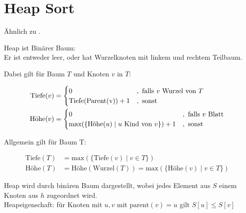     \section{Heap Sort}
        Ähnlich zu . \\
        \begin{definition}
            Heap ist Binärer Baum:\\
            Er ist entweder leer, oder hat Wurzelknoten mit linkem und rechtem Teilbaum.
        \end{definition}
        
        Dabei gilt für Baum $T$ und Knoten $v$ in $T$: 

        \begin{align*}
            \text{Tiefe}(v) &= \begin{cases}
                                0 &, \text{ falls $v$ Wurzel von $T$} \\
                                \text{Tiefe}(\text{Parent}($v$)) + 1 &, \text{ sonst}
                            \end{cases} \\
            \text{Höhe}(v) &= \begin{cases}
                                0 &, \text{ falls $v$ Blatt} \\
                                \text{max}(\{\text{Höhe($u$)} \mid \text{$u$ Kind von $v$} \}) + 1 &, \text{ sonst}
                            \end{cases} 
        \end{align*}

        Allgemein gilt für Baum T:

        \begin{align*}
            \text{Tiefe}(T) &= \text{max}(\{\text{Tiefe}(v) \mid v \in T\}) \\ 
            \text{Höhe}(T)  &= \text{Höhe}(\text{Wurzel}(T)) = \text{max}(\{\text{Höhe}(v) \mid v \in T\}) 
        \end{align*}


        Heap wird durch binären Baum dargestellt, wobei jedes Element aus $S$ einem Knoten aus $h$ zugeordnet wird. \\
        Heapeigenschaft: für Knoten mit $u,v$ mit $\text{parent}(v) = u$ gilt $S [u] \leq S [v]$ \\
        
